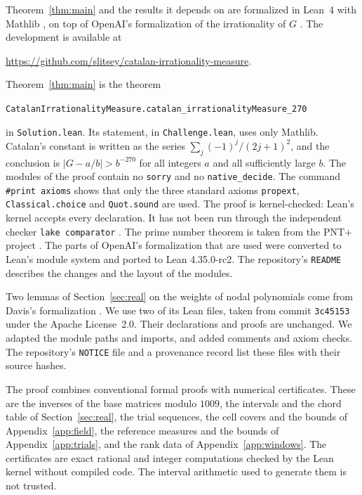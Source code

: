 \documentclass[11pt]{amsart}
\newcommand{\FormalizationURL}{https://github.com/slitsey/catalan-irrationality-measure}
\newcommand{\FormalizationLink}{\url{\FormalizationURL}}
\theoremstyle{definition}
\theoremstyle{remark}
\numberwithin{equation}{section}
\newcommand{\lean}[1]{\texttt{#1}}
\begin{document}
Theorem~\ref{thm:main} and the results it depends on are formalized in Lean~4 \cite{Lean4} with Mathlib \cite{Mathlib}, on top of OpenAI's
formalization of the irrationality of $G$ \cite{OpenAI2026}. The development is available at
\begin{center}
\FormalizationLink.
\end{center}
Theorem~\ref{thm:main} is the theorem
\begin{center}
{\small\texttt{CatalanIrrationalityMeasure.catalan\_irrationalityMeasure\_270}}
\end{center}
in \lean{Solution.lean}. Its statement, in \lean{Challenge.lean}, uses only Mathlib. Catalan's constant is
written as the series $\sum_j(-1)^j/(2j+1)^2$, and the conclusion is $|G-a/b|>b^{-270}$ for all integers $a$
and all sufficiently large $b$. The modules of the proof contain no \lean{sorry} and no \lean{native\_decide}. The command
\lean{\#print axioms} shows that only the three standard axioms \lean{propext}, \lean{Classical.choice} and
\lean{Quot.sound} are used. The proof is kernel-checked: Lean's kernel accepts every declaration. It has not been run through the independent checker \lean{lake comparator} \cite{Comparator}.
The prime number theorem is taken from the PNT+ project \cite{PNTPlus}. The parts of
OpenAI's formalization that are used were converted to Lean's module system and ported to Lean
4.35.0-rc2. The repository's \texttt{README} describes the changes and the layout of the modules.

Two lemmas of Section~\ref{sec:real} on the weights of nodal polynomials come from Davis's formalization
\cite{Davis2026}. We use two of its Lean files, taken from commit \texttt{3c45153} under the Apache
License~2.0. Their declarations and proofs are unchanged. We adapted the module paths and imports, and added comments and
axiom checks. The repository's \texttt{NOTICE} file and a provenance record list these files with their source
hashes.

The proof combines conventional formal proofs with numerical certificates. These are the inverses of the base
matrices modulo $1009$, the intervals and the chord table of Section~\ref{sec:real}, the trial sequences, the
cell covers and the bounds of Appendix~\ref{app:field}, the reference measures
and the bounds of Appendix~\ref{app:trials}, and the rank data of Appendix~\ref{app:windows}. The certificates are
exact rational and integer computations checked by the Lean kernel without compiled code. The interval
arithmetic used to generate them \cite{Arb} is not trusted.
\end{document}
